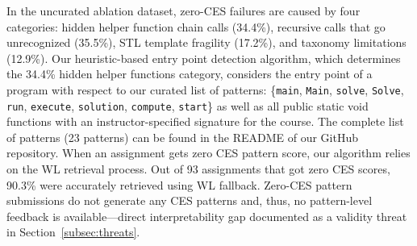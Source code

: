 In the uncurated ablation dataset, zero-CES failures are caused by four categories: hidden helper function chain calls (34.4\%), recursive calls that go unrecognized (35.5\%), STL template fragility (17.2\%), and taxonomy limitations (12.9\%). Our heuristic-based entry point detection algorithm, which determines the 34.4\% hidden helper functions category, considers the entry point of a program with respect to our curated list of patterns: \{\texttt{main}, \texttt{Main}, \texttt{solve}, \texttt{Solve}, \texttt{run}, \texttt{execute}, \texttt{solution}, \texttt{compute}, \texttt{start}\} as well as all public static void functions with an instructor-specified signature for the course. The complete list of patterns (23 patterns) can be found in the README of our GitHub repository. When an assignment gets zero CES pattern score, our algorithm relies on the WL retrieval process. Out of 93 assignments that got zero CES scores, 90.3\% were accurately retrieved using WL fallback. Zero-CES pattern submissions do not generate any CES patterns and, thus, no pattern-level feedback is available---direct interpretability gap documented as a validity threat in Section~\ref{subsec:threats}.

